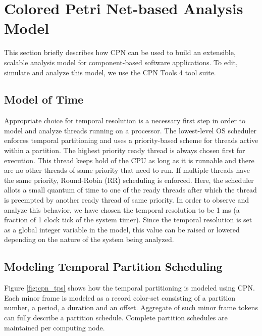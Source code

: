 \section{Colored Petri Net-based Analysis Model}
\label{sec:CPN_Modeling}

This section briefly describes how CPN can be used to build an extensible, scalable analysis model for component-based software applications. %
To edit, simulate and analyze this model, we use the CPN Tools 4 \cite{CPNTools} tool suite.  

\subsection{Model of Time}
\label{sec:model_of_time}

Appropriate choice for temporal resolution is a necessary first step in order to model and analyze threads running on a processor. The lowest-level OS scheduler enforces temporal partitioning and uses a priority-based scheme for threads active within a partition. The highest priority ready thread is always chosen first for execution. This thread keeps hold of the CPU as long as it is runnable and there are no other threads of same priority that need to run. If multiple threads have the same priority, Round-Robin (RR) scheduling  is enforced. Here, the scheduler allots a small quantum of time to one of the ready threads after which the thread is preempted by another ready thread of same priority. In order to observe and analyze this behavior, we have chosen the temporal resolution to be 1 ms (a fraction of 1 clock tick of the system timer). Since the temporal resolution is set as a global integer variable in the model, this value can be raised or lowered depending on the nature of the system being analyzed. 

\subsection{Modeling Temporal Partition Scheduling}
\label{sec:Modeling_Temporal_Partition_Scheduling}

Figure \ref{fig:cpn_tps} shows how the temporal partitioning is modeled using CPN. Each minor frame is modeled as a record color-set consisting of a partition number, a period, a duration and an offset. Aggregate of such minor frame tokens can fully describe a partition schedule. Complete partition schedules are maintained per computing node.

